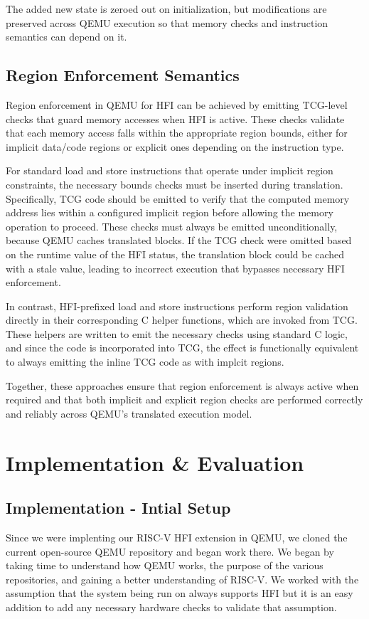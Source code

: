 \documentclass[conference,compsoc]{IEEEtran}
\begin{document}
The added new state is zeroed out on initialization, but modifications are preserved across QEMU execution so that memory checks and instruction semantics can depend on it. 

\subsection{Region Enforcement Semantics}
Region enforcement in QEMU for HFI can be achieved by emitting TCG-level checks that guard memory accesses when HFI is active. These checks validate that each memory access falls within the appropriate region bounds, either for implicit data/code regions or explicit ones depending on the instruction type.

For standard load and store instructions that operate under implicit region constraints, the necessary bounds checks must be inserted during translation. Specifically, TCG code should be emitted to verify that the computed memory address lies within a configured implicit region before allowing the memory operation to proceed. These checks must always be emitted unconditionally, because QEMU caches translated blocks. If the TCG check were omitted based on the runtime value of the HFI status, the translation block could be cached with a stale value, leading to incorrect execution that bypasses necessary HFI enforcement.

In contrast, HFI-prefixed load and store instructions perform region validation directly in their corresponding C helper functions, which are invoked from TCG. These helpers are written to emit the necessary checks using standard C logic, and since the code is incorporated into TCG, the effect is functionally equivalent to always emitting the inline TCG code as with implcit regions.

Together, these approaches ensure that region enforcement is always active when required and that both implicit and explicit region checks are performed correctly and reliably across QEMU's translated execution model.


\section{Implementation \& Evaluation}
\label{sec:impl-eval}

\subsection{Implementation - Intial Setup}
Since we were implenting our RISC-V HFI extension in QEMU, we cloned the current open-source QEMU repository and began work there. We began by taking time to understand how QEMU works, the purpose of the various repositories, and gaining a better understanding of RISC-V. We worked with the assumption that the system being run on always supports HFI but it is an easy addition to add any necessary hardware checks to validate that assumption.
\end{document}
